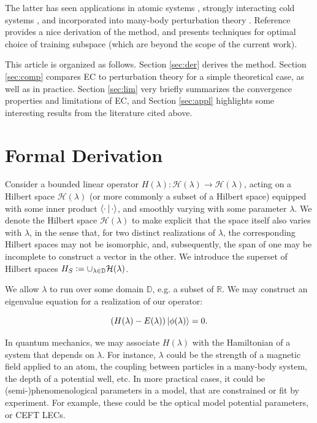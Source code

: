 \documentclass[%
 reprint,
 amsmath,amssymb,
 aps,
]{revtex4-2}
\begin{document}
The latter has seen applications in atomic systems \cite{demol2020improved}, strongly interacting cold systems \cite{eklind2021eigenvector}, and incorporated into many-body perturbation theory \cite{demol2021bogoliubov}. Reference \cite{eklind2021eigenvector} provides a nice derivation of the method, and presents techniques for optimal choice of training subspace (which are beyond the scope of the current work).

This article is organized as follows. Section \ref{sec:der} derives the method. Section \ref{sec:comp} compares \ac{EC} to perturbation theory for a simple theoretical case, as well as in practice. Section \ref{sec:lim} very briefly summarizes the convergence properties and limitations of \ac{EC}, and Section \ref{sec:appl} highlights some interesting results from the literature cited above.


\section{\label{sec:der}Formal Derivation}

Consider a bounded linear operator $H(\lambda) : \mathcal{H}(\lambda) \rightarrow \mathcal{H}(\lambda)$, acting on a Hilbert space $\mathcal{H}(\lambda)$ (or more commonly a subset of a Hilbert space) equipped with some inner product $\Braket{\cdot|\cdot}$, and smoothly varying with some parameter $\lambda$. We denote the Hilbert space $\mathcal{H}(\lambda)$ to make explicit that the space itself also varies with $\lambda$, in the sense that, for two distinct realizations of $\lambda$, the
corresponding Hilbert spaces may not be isomorphic, and, subsequently, the span of one may be incomplete to construct a vector in the other. We introduce the superset of Hilbert spaces $H_S \vcentcolon= \cup_{\lambda \in \mathbb{D}}  \mathcal{H}(\lambda)$.

We allow $\lambda$ to run over some domain $\mathbb{D}$, e.g. a subset of $\mathbb{R}$.  We may construct an eigenvalue equation for a realization of our operator:

\begin{equation}
  \left( H(\lambda) - E(\lambda)  \right) \ket{\phi(\lambda)} = 0.
\end{equation}

In quantum mechanics, we may associate $H(\lambda)$ with the Hamiltonian of a system that depends on $\lambda$. For instance, $\lambda$ could be the strength of a magnetic field applied to an atom, the coupling between particles in a many-body system, the depth of a potential well, etc. In more practical cases, it could be (semi-)phenomenological parameters in a model, that are constrained or fit by experiment. For example, these could be the optical model potential parameters, or \ac{CEFT}
\ac{LEC}s.
\end{document}
